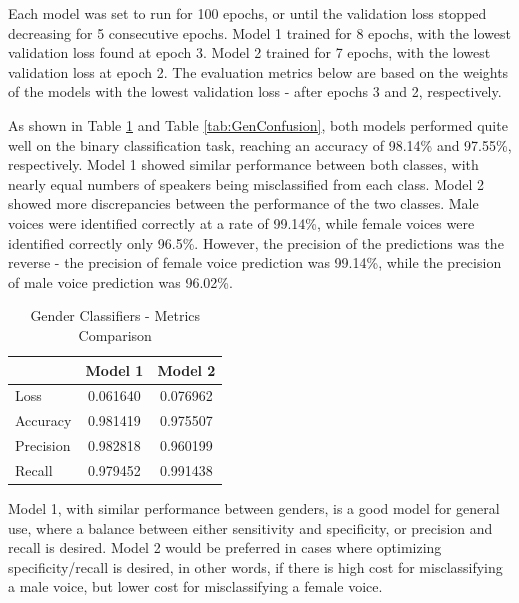 Each model was set to run for 100 epochs, or until the validation loss stopped decreasing for 5 consecutive epochs. Model 1 trained for 8 epochs, with the lowest validation loss found at epoch 3. Model 2 trained for 7 epochs, with the lowest validation loss at epoch 2. The evaluation metrics below are based on the weights of the models with the lowest validation loss - after epochs 3 and 2, respectively.

As shown in Table \ref{tab:GenMetricsSum} and Table \ref{tab:GenConfusion}, both models performed quite well on the binary classification task, reaching an accuracy of 98.14\% and 97.55\%, respectively. Model 1 showed similar performance between both classes, with nearly equal numbers of speakers being misclassified from each class. Model 2 showed more discrepancies between the performance of the two classes. Male voices were identified correctly at a rate of 99.14\%, while female voices were identified correctly only 96.5\%. However, the precision of the predictions was the reverse - the precision of female voice prediction was 99.14\%, while the precision of male voice prediction was 96.02\%.

\begin{table}[h]
\begin{center}
\caption{Gender Classifiers - Metrics Comparison}
\begin{tabular}{l c c}
& 	Model 1 & Model 2 \\ \hline
Loss	&0.061640 & 0.076962 \\
Accuracy& 0.981419 & 0.975507 \\
Precision & 0.982818 & 0.960199 \\
Recall & 0.979452 & 0.991438 \\
\end{tabular}
\label{tab:GenMetricsSum}
\end{center}
\end{table}

Model 1, with similar performance between genders, is a good model for general use, where a balance between either sensitivity and specificity, or precision and recall is desired. Model 2 would be preferred in cases where optimizing specificity/recall is desired, in other words, if there is high cost for misclassifying a male voice, but lower cost for misclassifying a female voice.

